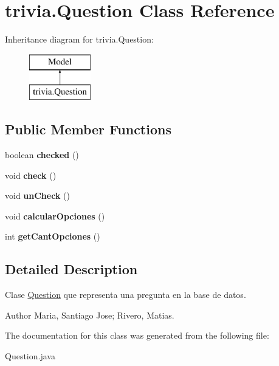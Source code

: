 \hypertarget{classtrivia_1_1Question}{}\section{trivia.\+Question Class Reference}
\label{classtrivia_1_1Question}
Inheritance diagram for trivia.\+Question\+:\begin{figure}[H]
\begin{center}
\leavevmode
\includegraphics[height=2.000000cm]{classtrivia_1_1Question}
\end{center}
\end{figure}
\subsection*{Public Member Functions}
\begin{DoxyCompactItemize}
\item 
\mbox{\label{classtrivia_1_1Question_a13790a82001883a78826412559c5d5a5}} 
boolean {\bfseries checked} ()
\item 
\mbox{\label{classtrivia_1_1Question_a8006494b6b5e147d27b25be464400207}} 
void {\bfseries check} ()
\item 
\mbox{\label{classtrivia_1_1Question_a16043077e35b68a3c68e7101b2f2a85d}} 
void {\bfseries un\+Check} ()
\item 
\mbox{\label{classtrivia_1_1Question_a52e5fe832dbeb80465259ddb09b52a43}} 
void {\bfseries calcular\+Opciones} ()
\item 
\mbox{\label{classtrivia_1_1Question_a1dc475316c29c5d9231a8cebcbeb55b6}} 
int {\bfseries get\+Cant\+Opciones} ()
\end{DoxyCompactItemize}


\subsection{Detailed Description}
Clase \mbox{\hyperlink{classtrivia_1_1Question}{Question}} que representa una pregunta en la base de datos. \begin{DoxyAuthor}{Author}
Maria, Santiago Jose; Rivero, Matias. 
\end{DoxyAuthor}


The documentation for this class was generated from the following file\+:\begin{DoxyCompactItemize}
\item 
Question.\+java\end{DoxyCompactItemize}
